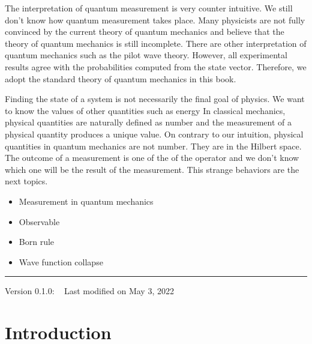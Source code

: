 \documentclass[letterpaper,10pt,english]{jupyterBook}
\begin{document}
\sphinxAtStartPar
The interpretation of quantum measurement is very counter intuitive. We still don’t know  how quantum measurement takes place.  Many physicists are not fully convinced by the current theory of quantum mechanics and believe that the theory of quantum mechanics is still incomplete.   There are other interpretation of quantum mechanics such as the pilot wave theory. However, all experimental results agree with the probabilities computed from the state vector.  Therefore, we adopt the standard theory of quantum mechanics in this book.

\sphinxAtStartPar
Finding the state of a system is not necessarily the final goal of physics.  We want to know the  values of other quantities such as  energy  In classical mechanics, physical quantities are naturally defined as number and the measurement of a physical quantity produces a unique value.  On contrary to our intuition, physical quantities in quantum mechanics are not number.  They are  in the Hilbert space.  The outcome of a measurement is one of the  of the operator and we don’t know which one will be the result of the measurement.  This strange behaviors are the next topics.

\sphinxAtStartPar
{}
\begin{itemize}
\item {}
\sphinxAtStartPar
 Measurement in quantum mechanics

\item {}
\sphinxAtStartPar
Observable

\item {}
\sphinxAtStartPar
Born rule

\item {}
\sphinxAtStartPar
Wave function collapse

\end{itemize}


\bigskip\hrule\bigskip


\sphinxAtStartPar
Version 0.1.0:   Last modified on May 3, 2022

\sphinxstepscope


\part{Introduction}

\sphinxstepscope
\end{document}
